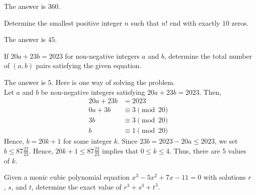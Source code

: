 \begin{solution}
The answer is $360$.
\end{solution}

\begin{problem}
Determine the smallest positive integer $n$ such that $n!$ end with exactly $10$ zeros.
\end{problem}

\begin{solution}
The answer is $45$.
\end{solution}

\begin{problem}
If $20a+23b=2023$ for non-negative integers $a$ and $b$, determine the total number of $(a,b)$ pairs satisfying the given equation.
\end{problem}

\begin{solution}
The answer is $5$. Here is one way of solving the problem.\\
	Let $a$ and $b$ be non-negative integers satisfying $20a+23b=2023$. Then,
	\begin{align*}
		20a+23b&=2023\\
		0a+3b&\equiv 3 \pmod{20}\\
		3b&\equiv 3 \pmod{20}\\
		b&\equiv 1 \pmod{20}
	\end{align*}
	Hence, $b=20k+1$ for some integer $k$. Since $23b=2023-20a\leq 2023$, we set $b\leq 87\frac{22}{23}$. Hence, $20k+1 \leq 87\frac{22}{23}$ implies that $0\leq k \leq 4$. Thus, there are $5$ values of $k$.
\end{solution}

\begin{problem}
Given a monic cubic polynomial equation $x^3-5x^2+7x-11=0$ with solutions $r$, $s$, and $t$, determine the exact value of $r^3+s^3+t^3$.
\end{problem}

